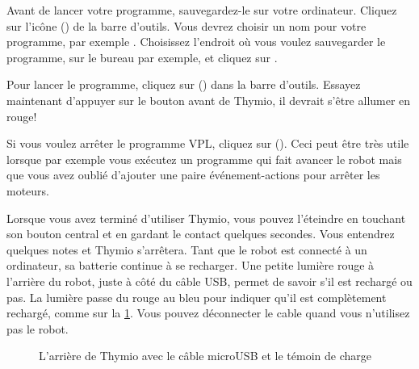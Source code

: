 
Avant de lancer votre programme, sauvegardez-le sur votre ordinateur.
Cliquez sur l'icône  () de la barre d'outils.
Vous devrez choisir un nom pour votre programme, par exemple .
Choisissez l'endroit où vous voulez sauvegarder le programme, sur le bureau par exemple, et cliquez sur .



Pour lancer le programme, cliquez sur  () dans la barre d'outils.
Essayez maintenant d'appuyer sur le bouton avant de Thymio, il devrait s'être allumer en rouge!


Si vous voulez arrêter le programme VPL, cliquez sur  ().
Ceci peut être très utile lorsque par exemple vous exécutez un programme qui fait avancer le robot mais que vous avez oublié d'ajouter une paire événement-actions pour arrêter les moteurs.


Lorsque vous avez terminé d'utiliser Thymio, vous pouvez l'éteindre en touchant son bouton central et en gardant le contact quelques secondes.
Vous entendrez quelques notes et Thymio s'arrêtera.
Tant que le robot est connecté à un ordinateur, sa batterie continue à se recharger. Une petite lumière rouge à l'arrière du robot, juste à côté du câble USB, permet de savoir s'il est rechargé ou pas. La lumière passe du rouge au bleu pour indiquer qu'il est complètement rechargé, comme sur la \cref{fig.back}.
Vous pouvez déconnecter le cable quand vous n'utilisez pas le robot.


\begin{figure}
\begin{center}
\caption{L'arrière de Thymio avec le câble microUSB et le témoin de charge}\label{fig.back}
\end{center}
\end{figure}


